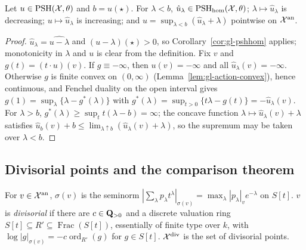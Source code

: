 \begin{theorem}\label{thm:gl-homog-decomposition}
\leanok
{}
Let $u\in\operatorname{PSH}(\mathcal X,\theta)$ and $b=u(\star)$. For $\lambda<b$, $\hat u_\lambda\in\operatorname{PSH}_{\mathrm{hom}}(\mathcal X,\theta)$; $\lambda\mapsto\hat u_\lambda$ is
decreasing; $u\mapsto\hat u_\lambda$ is increasing; and $u=\sup_{\lambda<b}(\hat u_\lambda+\lambda)$ pointwise on $\mathcal X^{\mathrm{an}}$.
\end{theorem}

\begin{proof}
$\hat u_\lambda=\widehat{u-\lambda}$ and $(u-\lambda)(\star)>0$, so Corollary~\ref{cor:gl-pshhom} applies; monotonicity in $\lambda$ and $u$ is clear from the definition.
Fix $v$ and $g(t)=(t\cdot u)(v)$. If $g\equiv-\infty$, then $u(v)=-\infty$ and all $\hat u_\lambda(v)=-\infty$. Otherwise $g$ is finite convex on $(0,\infty)$
(Lemma~\ref{lem:gl-action-convex}), hence continuous, and Fenchel duality on the open interval gives $g(1)=\sup_\lambda\{\lambda-g^*(\lambda)\}$ with
$g^*(\lambda)=\sup_{t>0}\{t\lambda-g(t)\}=-\hat u_\lambda(v)$. For $\lambda>b$, $g^*(\lambda)\ge\sup_tt(\lambda-b)=\infty$; the concave function $\lambda\mapsto\hat u_\lambda(v)+\lambda$ satisfies
$\hat u_b(v)+b\le\lim_{\lambda\uparrow b}(\hat u_\lambda(v)+\lambda)$, so the supremum may be taken over $\lambda<b$.
\end{proof}

\subsection{Divisorial points and the comparison theorem}\label{subsec:gl-comparison}

\begin{definition}\label{def:gl-div}
\leanok
{}
For $v\in\mathcal X^{\mathrm{an}}$, $\sigma(v)$ is the seminorm $|\sum_\lambda p_\lambda t^\lambda|_{\sigma(v)}=\max_\lambda|p_\lambda|_ve^{-\lambda}$ on $S[t]$. $v$ is
\emph{divisorial} if there are $c\in\mathbf{Q}_{>0}$ and a discrete valuation ring $S[t]\subseteq R'\subseteq\operatorname{Frac}(S[t])$, essentially of finite type
over $k$, with $\log|g|_{\sigma(v)}=-c\operatorname{ord}_{R'}(g)$ for $g\in S[t]$. $\mathcal X^{\mathrm{div}}$ is the set of divisorial points.
\end{definition}

